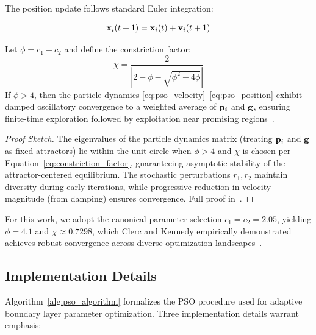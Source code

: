 The position update follows standard Euler integration:

\begin{equation}
\label{eq:pso_position}
\mathbf{x}_i(t+1) = \mathbf{x}_i(t) + \mathbf{v}_i(t+1)
\end{equation}

\begin{theorem}
\label{thm:pso_convergence}
Let $\phi = c_1 + c_2$ and define the constriction factor:
\begin{equation}
\label{eq:constriction_factor}
\chi = \frac{2}{\left| 2 - \phi - \sqrt{\phi^2 - 4\phi} \right|}
\end{equation}
If $\phi > 4$, then the particle dynamics \eqref{eq:pso_velocity}--\eqref{eq:pso_position} exhibit damped oscillatory convergence to a weighted average of $\mathbf{p}_i$ and $\mathbf{g}$, ensuring finite-time exploration followed by exploitation near promising regions~\cite{clerc2002particle}.
\end{theorem}

\begin{proof}[Proof Sketch]
The eigenvalues of the particle dynamics matrix (treating $\mathbf{p}_i$ and $\mathbf{g}$ as fixed attractors) lie within the unit circle when $\phi > 4$ and $\chi$ is chosen per Equation~\eqref{eq:constriction_factor}, guaranteeing asymptotic stability of the attractor-centered equilibrium. The stochastic perturbations $r_1, r_2$ maintain diversity during early iterations, while progressive reduction in velocity magnitude (from damping) ensures convergence. Full proof in~\cite{clerc2002particle, trelea2003analysis}.
\end{proof}

For this work, we adopt the canonical parameter selection $c_1 = c_2 = 2.05$, yielding $\phi = 4.1$ and $\chi \approx 0.7298$, which Clerc and Kennedy empirically demonstrated achieves robust convergence across diverse optimization landscapes~\cite{clerc2002particle}.

\subsection{Implementation Details}
\label{subsec:pso_implementation}

Algorithm~\ref{alg:pso_algorithm} formalizes the PSO procedure used for adaptive boundary layer parameter optimization. Three implementation details warrant emphasis:

